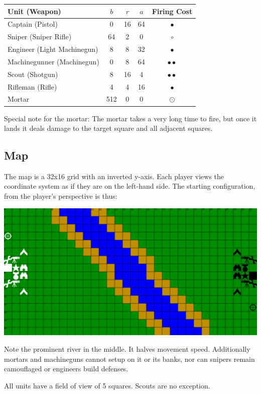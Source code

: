 \documentclass{article}
\begin{document}
\begin{tabular}{l | c | c | c | c}
    Unit (Weapon) & $b$ & $r$ & $a$ & Firing Cost \\ \hline
    Captain (Pistol) & 0 & 16 & 64 & $\bullet$ \\ \hline
    Sniper (Sniper Rifle) & 64 & 2 & 0 & $\circ$ \\ \hline
    Engineer (Light Machinegun) & 8 & 8 & 32 & $\bullet$ \\ \hline
    Machinegunner (Machinegun) & 0 & 8 & 64 & $\bullet\bullet$ \\ \hline
    Scout (Shotgun) & 8 & 16 & 4 & $\bullet\bullet$ \\ \hline
    Rifleman (Rifle) & 4 & 4 & 16 & $\bullet$ \\ \hline
    Mortar & 512 & 0 & 0 & $\odot$ \\ \hline
\end{tabular}

Special note for the mortar: The mortar takes a very long time to fire, but once
it lands it deals damage to the target square and all adjacent squares.

\subsection*{Map}

The map is a 32x16 grid with an inverted y-axis. Each player views the
coordinate system as if they are on the left-hand side. The starting
configuration, from the player's perspective is thus:

\includegraphics[width=\textwidth]{res/map.png}

Note the prominent river in the middle. It halves movement speed. Additionally
mortars and machineguns cannot setup on it or its banks, nor can snipers remain
camouflaged or engineers build defenses.

All units have a field of view of 5 squares. Scouts are no exception.
\end{document}
